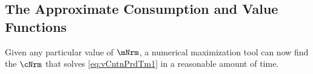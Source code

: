 \documentclass[SolvingMicroDSOPs]{subfiles}
\begin{document}
\unskip

\ifcode{
    
    }{}

\hypertarget{the-approximate-consumption-and-value-functions}{}
\subsection{The Approximate Consumption and Value Functions}

Given any particular value of $\mNrm$, a numerical maximization tool can now find the $\cNrm$ that solves \eqref{eq:vCntnPrdTm1} in a reasonable amount of time.
\end{document}
